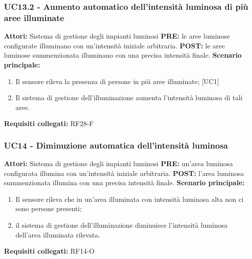 \documentclass[a4paper, 12pt]{article}
\begin{document}
\subsubsection{UC13.2 - Aumento automatico dell'intensità luminosa di più aree illuminate}
\textbf{Attori:} Sistema di gestione degli impianti luminosi \newline
\textbf{PRE:} le aree luminose configurate illuminano con un'intensità iniziale arbitraria.\newline
\textbf{POST:} le aree luminose summenzionata illuminano con una precisa intensità finale.\newline
\textbf{Scenario principale:}
\begin{enumerate}
    \item Il sensore rileva la presenza di persone in più aree illuminate; [UC1]
    \item Il sistema di gestione dell'illuminazione aumenta l'intensità luminosa di tali aree.
\end{enumerate}
\textbf{Requisiti collegati:} RF28-F\newline

\subsubsection{UC14 - Diminuzione automatica dell'intensità luminosa}
\textbf{Attori:} Sistema di gestione degli impianti luminosi \newline
\textbf{PRE:} un'area luminosa configurata illumina con un'intensità iniziale arbitraria.\newline
\textbf{POST:} l'area luminosa summenzionata illumina con una precisa intensità finale.\newline
\textbf{Scenario principale:}
\begin{enumerate}
    \item Il sensore rileva che in un'area illuminata con intensità luminosa alta non ci sono persone presenti;
    \item il sistema di gestione dell'illuminazione diminuisce l'intensità luminosa dell'area illuminata rilevata.
\end{enumerate}
\textbf{Requisiti collegati:} RF14-O\newline
\end{document}
